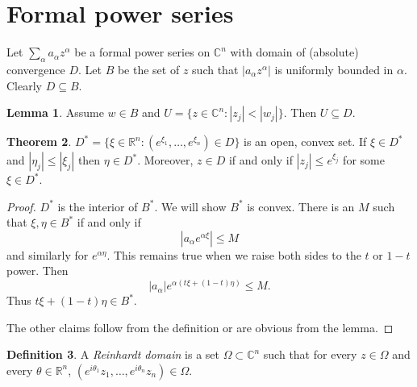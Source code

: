 \documentclass[12pt]{report}
\newcommand{\RR}{\mathbb{R}}
\newcommand{\CC}{\mathbb{C}}
\newcommand{\dfn}[1]{\emph{#1}\index{#1}}
\theoremstyle{definition}
\newtheorem{theorem}{Theorem}[chapter]
\newtheorem{lemma}[theorem]{Lemma}
\newtheorem{definition}[theorem]{Definition}
\begin{document}
\section{Formal power series}
Let $\sum_\alpha a_\alpha z^\alpha$ be a formal power series on $\CC^n$ with domain of (absolute) convergence $D$. Let $B$ be the set of $z$ such that $|a_\alpha z^\alpha|$ is uniformly bounded in $\alpha$. Clearly $D \subseteq B$.
\begin{lemma}
    Assume $w \in B$ and $U = \{z \in \CC^n: |z_j| < |w_j|\}$. Then $U \subseteq D$. 
\end{lemma}
\begin{theorem}
    $D^* = \{\xi \in \RR^n: (e^{\xi_1}, \dots, e^{\xi_n}) \in D\}$ is an open, convex set. If $\xi \in D^*$ and $|\eta_j| \leq |\xi_j|$ then $\eta \in D^*$. Moreover, $z \in D$ if and only if $|z_j| \leq e^{\xi_j}$ for some $\xi \in D^*$.
\end{theorem}
\begin{proof}
    $D^*$ is the interior of $B^*$. We will show $B^*$ is convex. There is an $M$ such that $\xi, \eta \in B^*$ if and only if
    $$|a_\alpha e^{\alpha\xi}| \leq M$$
    and similarly for $e^{\alpha\eta}$. This remains true when we raise both sides to the $t$ or $1-t$ power. Then
    $$|a_\alpha|e^{\alpha(t\xi + (1-t)\eta)} \leq M.$$
    Thus $t\xi + (1-t)\eta \in B^*$.

    The other claims follow from the definition or are obvious from the lemma.
\end{proof}
\begin{definition}
    A \dfn{Reinhardt domain} is a set $\Omega \subset \CC^n$ such that for every $z \in \Omega$ and every $\theta \in \RR^n$, $(e^{i\theta_1} z_1, \dots, e^{i\theta_n} z_n) \in \Omega$.
\end{definition}
\end{document}
